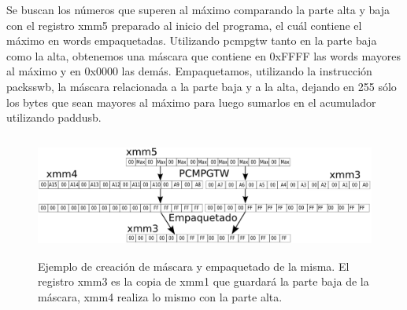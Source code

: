 \begin{center}
\end{center}

Se buscan los números que superen al máximo comparando la parte alta y baja con el registro xmm5 preparado al inicio del programa, el cuál contiene el máximo en words empaquetadas. Utilizando pcmpgtw tanto en la parte baja como la alta, obtenemos una máscara que contiene en 0xFFFF las words mayores al máximo y en 0x0000 las demás. Empaquetamos, utilizando la instrucción packsswb, la máscara relacionada a la parte baja y a la alta, dejando en 255 sólo los bytes que sean mayores al máximo para luego sumarlos en el acumulador utilizando paddusb.

\begin{figure}[H]
\centering
\includegraphics[width=150mm, height=40mm]{cpmmax.png}
\caption{Ejemplo de creación de máscara y empaquetado de la misma. El registro xmm3 es la copia de xmm1 que guardará la parte baja de la máscara, xmm4 realiza lo mismo con la parte alta.}
\label{overflow}
\end{figure}



